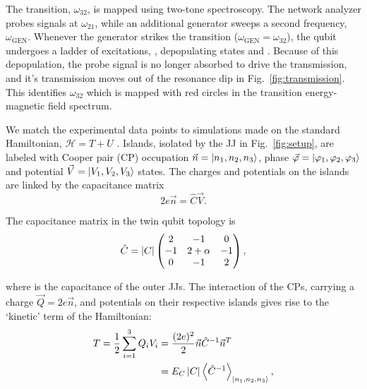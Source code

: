 The \ilra{}  transition, $\omega_{32}$, is  mapped using two-tone  spectroscopy.  The
network analyzer probes signals  at $ \omega_{21} $, while an additional  generator sweeps a second
frequency,  $  \omega_{\text{GEN}} $.   Whenever  the  generator strikes  the  \ira{}
transition ($\omega_{\text{GEN}} = \omega_{32} $), the qubit undergoes a ladder of excitations, 
    ,  depopulating  states    and
.  Because of this  depopulation, the probe signal is no longer  absorbed to drive the
\ilra {} transmission,  and it's transmission moves out of  the resonance dip in
Fig.~\ref{fig:transmission}.  This identifies $\omega_{32}$ which is mapped with red circles in the
transition energy-magnetic field spectrum.


We  match the  experimental  data points  to  simulations made  on  the standard  Hamiltonian,
$  \mathcal{H}   =  T   +  U   $  \cite{orlando1999}.    Islands,  isolated   by  the   JJ  in
Fig.~\ref{fig:setup},     are     labeled     with     Cooper     pair     (CP)     occupation
$         \vec{n}        =         \Ket{n_1,        n_2,         n_3}        $,         phase
$       \vec{\varphi}       =      \Ket{\varphi_1,       \varphi_2,       \varphi_3}       $      and       potential
$ \vec{V} =  \Ket{V_{1}, V_{2}, V_{3}} $  states.  The charges and potentials  on the islands
are linked by the capacitance matrix
\begin{equation}
  \label{eq:link}
  2e\vec{n} = \hat{C}\vec{V}.
\end{equation}

\noindent The capacitance matrix in the twin qubit topology is
\begin{equation}
  \label{eq:capac}
  \hat{C} = \left|C\right| \begin{pmatrix}
    2  &  -1  &  0\\
    -1  &  2  +  \alpha  &  -1\\
    0  &  -1  & 2
  \end{pmatrix},
\end{equation}

\noindent where   is the capacitance  of the outer  JJs.  The interaction of  the CPs,
carrying a charge $ \vec{Q}=2e\vec{n} $, and potentials on their respective islands gives rise
to the `kinetic' term of the Hamiltonian:
\begin{equation}\label{eq:kinetic}
  \begin{aligned}
    T = \frac{1}{2}\sum_{i=1}^{3}Q_iV_i & =
    \frac{(2e)^2}{2}\vec{n}\hat{C}^{-1}\vec{n}^{T}\\
    & = E_C \left|C\right| \left\langle \hat{C}^{-1} \right\rangle_{\Ket{n_{1}, n_2, n_3}},
  \end{aligned}
\end{equation}

